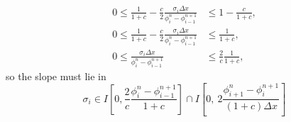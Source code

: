 \documentclass[../thesis.tex]{subfiles}
\begin{document}
\begin{equation}\label{eqn: urc-all c- sufficient}
    \begin{split}
        0
        \leq
        \frac{1}{1+c}
        -\frac{c}{2}
        \frac{\sigma_{i}\Delta x}
        {\phi_{i}^{n} - \phi_{i-1}^{n+1}}
        &\leq
        1 - \frac{c}{1+c},
        \\
        0
        \leq
        \frac{1}{1+c}
        -\frac{c}{2}
        \frac{\sigma_{i}\Delta x}
        {\phi_{i}^{n} - \phi_{i-1}^{n+1}}
        &\leq
        \frac{1}{1+c},
        \\
        0
        \leq
        \frac{\sigma_{i}\Delta x}
        {\phi_{i}^{n} - \phi_{i-1}^{n+1}}
        &\leq
        \frac{2}{c}
        \frac{1}{1+c},
    \end{split}
\end{equation}
so the slope must lie in
\begin{equation}
    \sigma_{i}
    \in
    I\left[
        0,
        \frac{2}{c}
        \frac{\phi_{i}^{n} - \phi_{i-1}^{n+1}}{1+c}
    \right]
    \cap
    I\left[
        0,
        ~2\frac{\phi_{i+1}^{n} - \phi_{i}^{n+1}}{(1+c)\Delta x}
    \right]
\end{equation}
\end{document}
